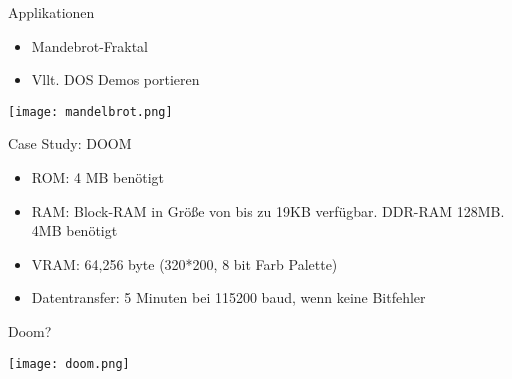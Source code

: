 \begin{frame}{Applikationen}
\begin{itemize}
\item Mandebrot-Fraktal
\item Vllt. DOS Demos portieren
\end{itemize}

\begin{center}
\texttt{[image: mandelbrot.png]}
\end{center}


\end{frame}

\begin{frame}{Case Study: DOOM}
\begin{itemize}
	\item ROM: 4 MB benötigt
	\item RAM: Block-RAM in Größe von bis zu 19KB verfügbar. DDR-RAM 128MB. 4MB benötigt
	\item VRAM: 64,256 byte (320*200, 8 bit Farb Palette)
	\item Datentransfer: 5 Minuten bei 115200 baud, wenn keine Bitfehler
\end{itemize}
\end{frame}


\begin{frame}{Doom?}
\begin{center}
\texttt{[image: doom.png]}
\end{center}
 
\end{frame}




